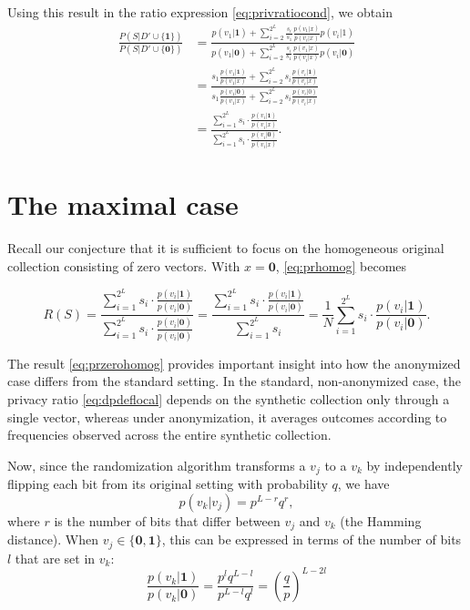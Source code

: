 \documentclass[11pt]{article}
\newcommand{\zv}{\textbf{0}}
\newcommand{\uv}{\textbf{1}}
\begin{document}
Using this result in the ratio expression \eqref{eq:privratiocond}, we obtain
\begin{align}
\frac{P(S|D'\cup\{\uv\})}{P(S|D'\cup\{\zv\})} 
&= \frac{ p(v_1|\uv)  + \sum_{i=2}^{2^L} \frac{s_i}{s_1}  \frac{p(v_1|x)}{p(v_i|x)}  p(v_i|1) } {p(v_1|\zv)  + \sum_{i=2}^{2^L} \frac{s_i}{s_1}  \frac{p(v_1|x)}{p(v_i|x)} p(v_i|\zv)}
\nonumber \\
&= \frac{ s_1 \frac{p(v_1|\uv)}{p(v_1|x)} + \sum_{i=2}^{2^L} s_i  \frac{p(v_i|\uv)}{p(v_i|x)}   } {s_1 \frac{p(v_1|\zv)}{p(v_1|x)} +   \sum_{i=2}^{2^L}  s_i  \frac{p(v_i|0)}{p(v_i|x)}  }
\nonumber \\
&=\frac{ \sum_{i=1}^{2^L} s_i \cdot \displaystyle\frac{p(v_i|\uv)}{p(v_i|x)}   } { \sum_{i=1}^{2^L}  s_i  \cdot\displaystyle\frac{p(v_i|\zv)}{p(v_i|x)}   }.
\label{eq:prhomog}
\end{align}

\section{The maximal case}

Recall our conjecture that it is sufficient to focus on the homogeneous original collection consisting of zero vectors.
With $x = \zv$, \eqref{eq:prhomog} becomes

\begin{equation}\label{eq:przerohomog}
R(S) =
\frac{ \sum_{i=1}^{2^L} s_i  \cdot \frac{p(v_i|\uv)}{p(v_i|\zv)}   } { \sum_{i=1}^{2^L}  s_i \cdot  \frac{p(v_i|\zv)}{p(v_i|\zv)}}
= \frac{ \sum_{i=1}^{2^L}  s_i \cdot  \frac{p(v_i|\uv)}{p(v_i|\zv)}}{ \sum_{i=1}^{2^L} s_i}
= \frac{1}{N} \sum_{i=1}^{2^L} s_i \cdot \frac{p(v_i|\uv)}{p(v_i|\zv)}.
\end{equation}

The result \eqref{eq:przerohomog} provides important insight into how the anonymized case differs from the standard setting.
In the standard, non-anonymized case, the privacy ratio \eqref{eq:dpdeflocal} depends on the synthetic collection only through a single vector, whereas under anonymization, it averages outcomes according to frequencies observed across the entire synthetic collection.

Now, since the randomization algorithm transforms a $v_j$ to a $v_k$ by independently flipping each bit from its original setting with probability $q$, we have
\[ p(v_k | v_j) = p^{L-r}q^r, \]
where $r$ is the number of bits that differ between $v_j$ and $v_k$ (the Hamming distance).
When $v_j \in \{\zv, \uv\}$, this can be expressed in terms of the number of bits $l$ that are set in $v_k$:
\begin{equation}\label{eq:qpratio}
\frac{p(v_k|\uv)}{p(v_k|\zv)} = \frac{p^lq^{L-l}}{p^{L-l}q^l } = \left ( \frac{q}{p} \right )^ {L - 2l}
\end{equation}
\end{document}
